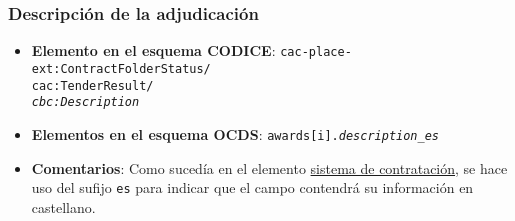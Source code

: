         \subsubsection{Descripción de la adjudicación}
            \begin{itemize}
                \item \textbf{Elemento en el esquema CODICE}:
                    \tabto{7.6cm} \texttt{cac-place-ext:ContractFolderStatus/} \\
                    \tabto{7.6cm} \texttt{cac:TenderResult/} \\
                    \tabto{7.6cm} \texttt{\textit{cbc:Description}}
                \item \textbf{Elementos en el esquema OCDS}:
                    \tabto{7.6cm} \texttt{awards[i].\textit{description\_es}}
                \item \textbf{Comentarios}: Como sucedía en el elemento  \hyperref[subsec:SistemaDeContratacion]{sistema de contratación}, se hace uso del sufijo \texttt{es} para indicar que el campo contendrá su información en castellano.
            \end{itemize}
\newpage